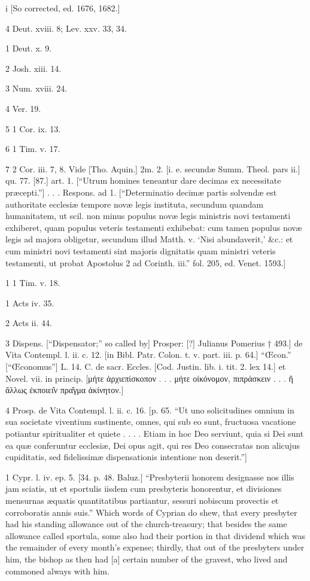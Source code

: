 i
[So corrected, ed. 1676, 1682.]

4
Deut. xviii. 8; Lev. xxv. 33, 34.

1
Deut. x. 9.

2
Josh. xiii. 14.

3
Num. xviii. 24.

4
Ver. 19.

5
1 Cor. ix. 13.

6
1 Tim. v. 17.

7
2 Cor. iii. 7, 8. Vide [Tho. Aquin.] 2m. 2. [i. e. secundæ Summ. Theol. pars ii.] qu. 77. [87.] art. 1. [“Utrum homines teneantur dare decimas ex necessitate præcepti.”] . . . Respons. ad 1. [“Determinatio decimæ partis solvendæ est authoritate ecclesiæ tempore novæ legis instituta, secundum quandam humanitatem, ut scil. non minus populus novæ legis ministris novi testamenti exhiberet, quam populus veteris testamenti exhibebat: cum tamen populus novæ legis ad majora obligetur, secundum illud Matth. v. ‘Nisi abundaverit,’ &c.: et cum ministri novi testamenti sint majoris dignitatis quam ministri veteris testamenti, ut probat Apostolus 2 ad Corinth. iii.” fol. 205, ed. Venet. 1593.]

1
1 Tim. v. 18.

1
Acts iv. 35.

2
Acts ii. 44.

3
Dispens. [“Dispensator;” so called by] Prosper: [?] Julianus Pomerius † 493.] de Vita Contempl. l. ii. c. 12. [in Bibl. Patr. Colon. t. v. part. iii. p. 64.] “Œcon.” [“Œconomus”] L. 14. C. de sacr. Eccles. [Cod. Justin. lib. i. tit. 2. lex 14.] et Novel. vii. in princip. [μήτε ἀρχιεπίσκοπον . . . μήτε οἰκόνομον, πιπράσκειν . . . ἢ ἄλλως ἐκποιει̑ν πρα̑γμα ἀκίνητον.]

4
Prosp. de Vita Contempl. l. ii. c. 16. [p. 65. “Ut uno solicitudines omnium in sua societate viventium sustinente, omnes, qui sub eo sunt, fructuosa vacatione potiantur spiritualiter et quiete . . . . Etiam in hoc Deo serviunt, quia si Dei sunt ea quæ conferuntur ecclesiæ, Dei opus agit, qui res Deo consecratas non alicujus cupiditatis, sed fidelissimæ dispensationis intentione non deserit.”]

1
Cypr. l. iv. ep. 5. [34. p. 48. Baluz.] “Presbyterii honorem designasse nos illis jam sciatis, ut et sportulis iisdem cum presbyteris honorentur, et divisiones mensurnas æquatis quantitatibus partiantur, sessuri nobiscum provectis et corroboratis annis suis.” Which words of Cyprian do shew, that every presbyter had his standing allowance out of the church-treasury; that besides the same allowance called sportula, some also had their portion in that dividend which was the remainder of every month’s expense; thirdly, that out of the presbyters under him, the bishop as then had [a] certain number of the gravest, who lived and commoned always with him.

